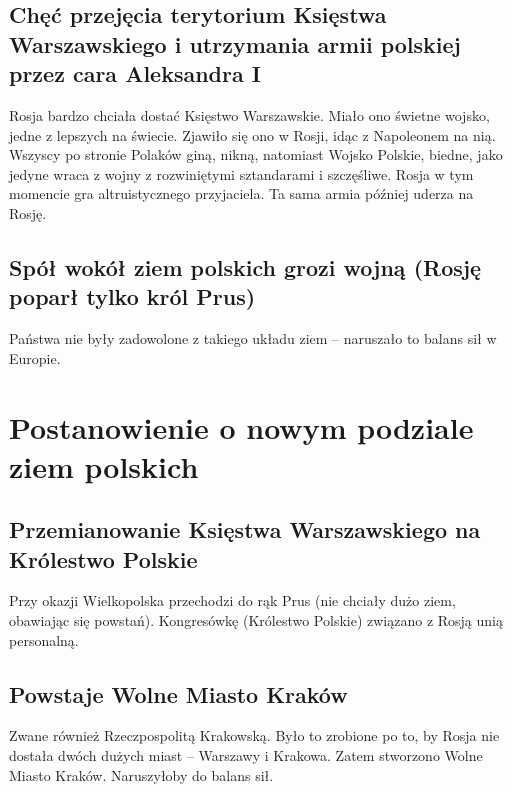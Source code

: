 \documentclass [a4paper, 11pt, oneside]{book}
\begin{document}
        \subsection{Chęć przejęcia terytorium Księstwa Warszawskiego i utrzymania armii polskiej przez cara Aleksandra I} %
        \label{sub:ch_przej_cia_terytorium_ksi_stwa_warszawskiego_i_utrzymania_armii_polskiej_przez_cara_aleksandra_i}
            Rosja bardzo chciała dostać Księstwo Warszawskie. Miało ono świetne wojsko, jedne z lepszych na świecie. Zjawiło się ono w Rosji, idąc z Napoleonem na nią. Wszyscy po stronie Polaków giną, nikną, natomiast Wojsko Polskie, biedne, jako jedyne wraca z wojny z rozwiniętymi sztandarami i szczęśliwe. Rosja w tym momencie gra altruistycznego przyjaciela. Ta sama armia później uderza na Rosję.
        \subsection{Spół wokół ziem polskich grozi wojną (Rosję poparł tylko król Prus)} %
        \label{sub:sp_wok_ziem_polskich_grozi_wojn_}
            Państwa nie były zadowolone z takiego układu ziem -- naruszało to balans sił w Europie.
    \section{Postanowienie o nowym podziale ziem polskich} %
    \label{sec:postanowienie_o_nowym_podziale_ziem_polskich}
        \subsection{Przemianowanie Księstwa Warszawskiego na Królestwo Polskie} %
        \label{sub:przemianowanie_ksi_stwa_warszawskiego_na_kr_lestwo_polskie}
            Przy okazji Wielkopolska przechodzi do rąk Prus (nie chciały dużo ziem, obawiając się powstań). Kongresówkę (Królestwo Polskie) związano z Rosją unią personalną.
        \subsection{Powstaje Wolne Miasto Kraków} %
        \label{sub:powstaje_wolne_miasto_krak_w}
            Zwane również Rzeczpospolitą Krakowską. Było to zrobione po to, by Rosja nie dostała dwóch dużych miast -- Warszawy i Krakowa. Zatem stworzono Wolne Miasto Kraków. Naruszyłoby do balans sił.
\end{document}
